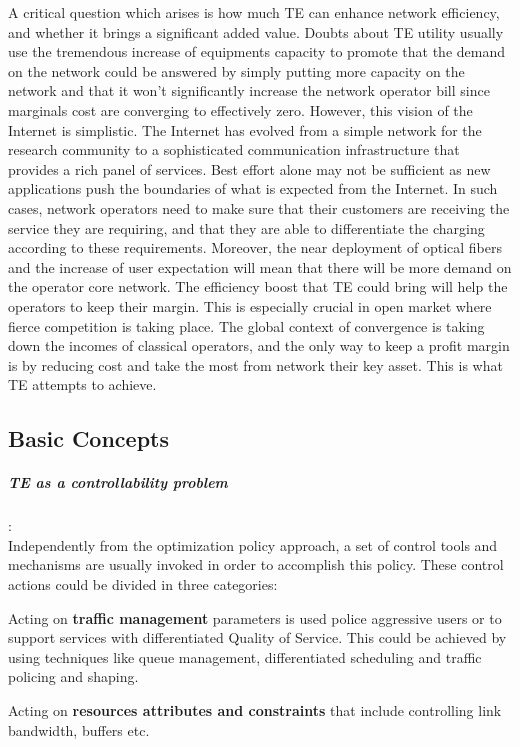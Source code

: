 A critical question which arises is how much TE can enhance network efficiency, and whether it brings a significant added value. 
Doubts about TE utility usually use the tremendous increase of equipments capacity to promote that the demand on the network could be answered by simply putting more capacity on the network and that it won't significantly increase the network operator bill since marginals cost are converging to effectively zero. However, this vision of the Internet is simplistic. The Internet has evolved from a simple network for the research community to a sophisticated communication infrastructure that provides a rich panel of services. 
Best effort alone may not be sufficient as new applications push the boundaries of what is expected from the Internet. In such cases, network operators need to make sure that their customers are receiving the service they are requiring, and that they are able to differentiate the charging according to  these requirements. Moreover, the near deployment of  optical fibers and the increase of user expectation will mean that there will be more demand on the operator core network. The efficiency boost that TE could bring will help the operators to keep their margin. This is especially crucial in open market where fierce competition is taking place. The global context of convergence is taking down the incomes of classical operators, and the only way to keep a profit margin is by reducing cost and take the most from network their key asset. This is what TE attempts to achieve.

\subsection{Basic Concepts}

\subparagraph{TE as a controllability problem }:
\\Independently from the optimization policy approach, a set of control tools and mechanisms are usually invoked in order to accomplish this policy. These control actions could be divided in three categories: 

Acting on {\bf traffic management} parameters is used police aggressive users or to support services with differentiated Quality of Service. This could be achieved by using techniques like queue management, differentiated scheduling and traffic policing and shaping.

Acting on {\bf resources attributes and constraints} that include controlling link bandwidth, buffers etc.
 
